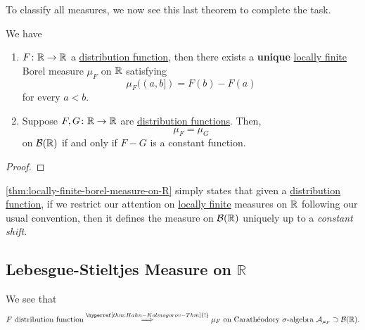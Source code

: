 To classify all measures, we now see this last theorem to complete the task.
\begin{theorem}\label{thm:locally-finite-borel-measure-on-R}
	We have
	\begin{enumerate}
		\item \(F\colon \mathbb{\MakeUppercase{r}} \to \mathbb{\MakeUppercase{r}} \) a \hyperref[def:distribution-function]{distribution function}, then there exists
		      a \textbf{unique} \hyperref[def:locally-finite]{locally finite} Borel measure \(\mu _F\) on \(\mathbb{\MakeUppercase{r}} \)
		      satisfying
		      \[
			      \mu _F((a, b]) = F(b) - F(a)
		      \]
		      for every \(a < b\).
		\item Suppose \(F, G\colon \mathbb{\MakeUppercase{r}} \to \mathbb{\MakeUppercase{r}} \) are \hyperref[def:distribution-function]{distribution functions}. Then,
		      \[
			      \mu _F = \mu _G
		      \]
		      on \(\mathcal{B} (\mathbb{\MakeUppercase{r}} )\) if and only if \(F-G\) is a constant function.
	\end{enumerate}
\end{theorem}
\begin{proof}
\end{proof}
\begin{remark}
	\autoref{thm:locally-finite-borel-measure-on-R} simply states that given a \hyperref[def:distribution-function]{distribution function},
	if we restrict our attention on \hyperref[def:locally-finite]{locally finite} measures on \(\mathbb{\MakeUppercase{r}} \) following our
	usual convention, then it defines the measure on \(\mathcal{B}(\mathbb{\MakeUppercase{r}} )\) uniquely up to a \emph{constant shift}.
\end{remark}

\subsection{Lebesgue-Stieltjes Measure on \(\mathbb{R} \)}
We see that
\[
	F \text{ distribution function} \overset{\hyperref[thm:Hahn-Kolmogorov-Thm]{!}}{\implies } \mu _F \text{ on Carathéodory \(\sigma\)-algebra }\mathcal{A}_{\mu _F}\supset \mathcal{B} (\mathbb{\MakeUppercase{r}}) .
\]


